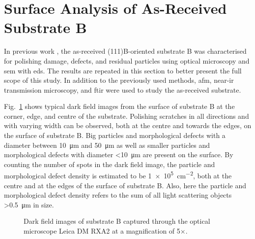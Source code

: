 \clearpage
\section{Surface Analysis of As-Received Substrate B}\label{sec:subBa}
In previous work \citep{lauten2017characterisation}, the as-received (111)B-oriented substrate B was characterised for polishing damage, defects, and residual particles using optical microscopy and \ac{sem} with \ac{eds}. The results are repeated in this section to better present the full scope of this study. In addition to the previously used methods, \ac{afm}, near-\ac{ir} transmission microscopy, and \ac{ftir} were used to study the as-received substrate.

Fig.~\ref{fig:subBa_om_df} shows typical dark field images from the surface of substrate B at the corner, edge, and centre of the substrate. Polishing scratches in all directions and with varying width can be observed, both at the centre and towards the edges, on the surface of substrate B. Big particles and morphological defects with a diameter between \SI{10}{\micro\metre} and \SI{50}{\micro\metre} as well as smaller particles and morphological defects with diameter \SI{<10}{\micro\metre} are present on the surface. By counting the number of spots in the dark field image, the particle and morphological defect density is estimated to be \SI{1e5}{\centi\metre^{-2}}, both at the centre and at the edges of the surface of substrate B. Also, here the particle and morphological defect density refers to the sum of all light scattering objects \SI{>0.5}{\micro\metre} in size.

\begin{figure}[htbp]
    \centering
    \caption[Dark field images of substrate B.]{Dark field images of substrate B captured through the optical microscope Leica DM RXA2 at a magnification of 5$\times$.}
    \label{fig:subBa_om_df}
\end{figure}

